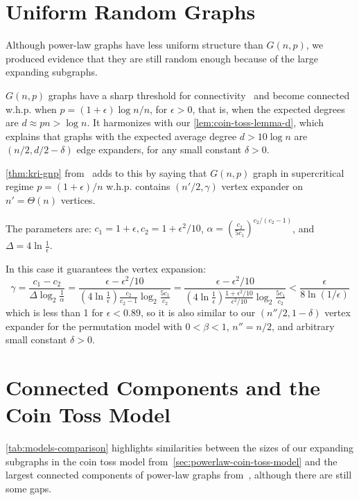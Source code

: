 \section{Uniform Random Graphs}

Although power-law graphs have less uniform structure than $G(n,p)$,
we produced evidence that they are still random enough because of
the large expanding subgraphs.

$G(n,p)$ graphs have a sharp threshold for connectivity~\cite{er59} and
become connected w.h.p. when $p=(1+\epsilon)\log n/n$, for $\epsilon>0$,
that is, when the expected degrees are $d\approx pn>\log n$.
It harmonizes with our \autoref{lem:coin-toss-lemma-d}, which explains
that graphs with the expected average degree $d>10\log n$
are $(n/2,d/2-\delta)$ edge expanders, for any small constant $\delta>0$.

\autoref{thm:kri-gnp} from~\cite{kri17} adds to this by saying that
$G(n,p)$ graph in supercritical regime $p=(1+\epsilon)/n$
w.h.p. contains $(n'/2,\gamma)$ vertex expander on $n'=\Theta(n)$ vertices.

The parameters are:
$c_1=1+\epsilon,c_2=1+\epsilon^2/10$,
$\alpha=\left(\frac{c_2}{5c_1}\right)^{c_2/(c_2-1)}$,
and $\Delta=4\ln\frac{1}{\epsilon}$.

In this case it guarantees the vertex expansion:
\begin{equation}
    \gamma=\frac{c_1-c_2}{\Delta\log_2{\frac{1}{\alpha}}}
    =\frac{\epsilon-\epsilon^2/10}{
        \left(4\ln\frac{1}{\epsilon}\right)
        \frac{c_2}{c_2-1}
        \log_2{\frac{5c_1}{c_2}}
    }
    =\frac{\epsilon-\epsilon^2/10}{
        \left(4\ln\frac{1}{\epsilon}\right)
        \frac{1+\epsilon^2/10}{\epsilon^2/10}
        \log_2{\frac{5c_1}{c_2}}
    }
    <\frac{\epsilon}{8\ln(1/\epsilon)}
\end{equation}
which is less than 1 for $\epsilon<0.89$, so it is also similar to
our $(n''/2,1-\delta)$ vertex expander for the permutation model
with $0<\beta<1$, $n''=n/2$, and arbitrary small constant $\delta>0$.

\section{Connected Components and the Coin Toss Model}

\autoref{tab:models-comparison} highlights similarities between the sizes of our
expanding subgraphs in the coin toss model from~\autoref{sec:powerlaw-coin-toss-model}
and the largest connected components of power-law graphs from~\cite{acl01},
although there are still some gaps.


